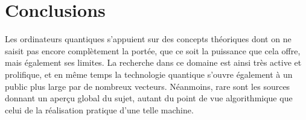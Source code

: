 \documentclass[final,5p,times,twocolumn,authoryear]{elsarticle}
\begin{document}
\section*{Conclusions}

Les ordinateurs quantiques s'appuient sur des concepts théoriques dont on ne saisit pas encore complètement la portée, que ce soit la puissance que cela offre, mais également ses limites. La recherche dans ce domaine est ainsi très active et prolifique, et en même temps la technologie quantique s'ouvre également à un public plus large par de nombreux vecteurs. Néanmoins, rare sont les sources donnant un aperçu global du sujet, autant du point de vue algorithmique que celui de la réalisation pratique d'une telle machine.







\end{document}
